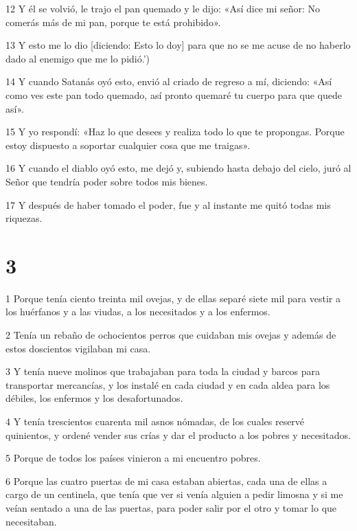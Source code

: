 \par 12 Y él se volvió, le trajo el pan quemado y le dijo: «Así dice mi señor: No comerás más de mi pan, porque te está prohibido».

\par 13 Y esto me lo dio [diciendo: Esto lo doy] para que no se me acuse de no haberlo dado al enemigo que me lo pidió.')

\par 14 Y cuando Satanás oyó esto, envió al criado de regreso a mí, diciendo: «Así como ves este pan todo quemado, así pronto quemaré tu cuerpo para que quede así».

\par 15 Y yo respondí: «Haz lo que desees y realiza todo lo que te propongas. Porque estoy dispuesto a soportar cualquier cosa que me traigas».

\par 16 Y cuando el diablo oyó esto, me dejó y, subiendo hasta debajo del cielo, juró al Señor que tendría poder sobre todos mis bienes.

\par 17 Y después de haber tomado el poder, fue y al instante me quitó todas mis riquezas.

\chapter{3}

\par 1 Porque tenía ciento treinta mil ovejas, y de ellas separé siete mil para vestir a los huérfanos y a las viudas, a los necesitados y a los enfermos.

\par 2 Tenía un rebaño de ochocientos perros que cuidaban mis ovejas y además de estos doscientos vigilaban mi casa.

\par 3 Y tenía nueve molinos que trabajaban para toda la ciudad y barcos para transportar mercancías, y los instalé en cada ciudad y en cada aldea para los débiles, los enfermos y los desafortunados.

\par 4 Y tenía trescientos cuarenta mil asnos nómadas, de los cuales reservé quinientos, y ordené vender sus crías y dar el producto a los pobres y necesitados.

\par 5 Porque de todos los países vinieron a mi encuentro pobres.

\par 6 Porque las cuatro puertas de mi casa estaban abiertas, cada una de ellas a cargo de un centinela, que tenía que ver si venía alguien a pedir limosna y si me veían sentado a una de las puertas, para poder salir por el otro y tomar lo que necesitaban.

